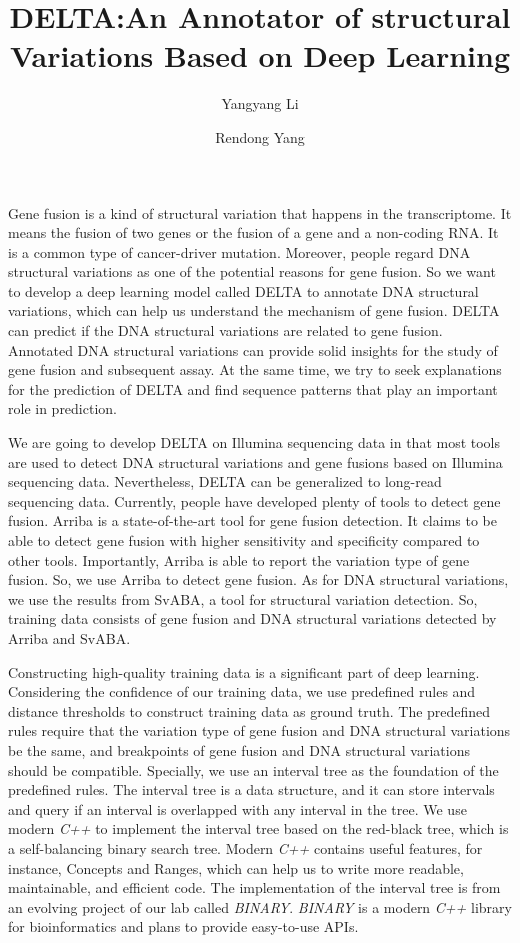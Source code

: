 \documentclass{article}
\title{DELTA:An Annotator of structural Variations Based on Deep Learning}
\author[1]{Yangyang Li}
\author[1]{Rendong Yang}
\affil[1]{\small Department of Urology, Northwestern University Feinberg School of Medicine, Chicago, IL 60611,
USA.}
\begin{document}
\maketitle



Gene fusion is a kind of structural variation that happens in the transcriptome.
It means the fusion of two genes or the fusion of a gene and a non-coding RNA\@.
It is a common type of cancer-driver mutation.
Moreover, people regard DNA structural variations as one of the potential reasons for gene fusion.
So we want to develop a deep learning model called DELTA to annotate DNA structural variations, which can help us understand the mechanism of gene fusion.
DELTA can predict if the DNA structural variations are related to gene fusion.
Annotated DNA structural variations can provide solid insights for the study of gene fusion and subsequent assay.
At the same time, we try to seek explanations for the prediction of DELTA and find sequence patterns that play an important role in prediction.

We are going to develop DELTA on Illumina sequencing data in that most tools are used to detect DNA structural variations and gene fusions based on Illumina sequencing data.
Nevertheless, DELTA can be generalized to long-read sequencing data.
Currently, people have developed plenty of tools to detect gene fusion.
Arriba is a state-of-the-art tool for gene fusion detection.
It claims to be able to detect gene fusion with higher sensitivity and specificity compared to other tools.
Importantly, Arriba is able to report the variation type of gene fusion.
So, we use Arriba to detect gene fusion.
As for DNA structural variations, we use the results from SvABA, a tool for structural variation detection.
So, training data consists of gene fusion and DNA structural variations detected by Arriba and SvABA\@.

Constructing high-quality training data is a significant part of deep learning.
Considering the confidence of our training data, we use predefined rules and distance thresholds to construct training data as ground truth.
The predefined rules require that the variation type of gene fusion and DNA structural variations be the same, and breakpoints of gene fusion and DNA structural variations should be compatible.
Specially, we use an interval tree as the foundation of the predefined rules.
The interval tree is a data structure, and it can store intervals and query if an interval is overlapped with any interval in the tree.
We use modern \textit{C++} to implement the interval tree based on the red-black tree, which is a self-balancing binary search tree.
Modern \textit{C++} contains useful features, for instance, Concepts and Ranges, which can help us to write more readable, maintainable, and efficient code.
The implementation of the interval tree is from an evolving project of our lab called \textit{BINARY}.
\textit{BINARY} is a modern \textit{C++} library for bioinformatics and plans to provide easy-to-use APIs\@.
\end{document}
